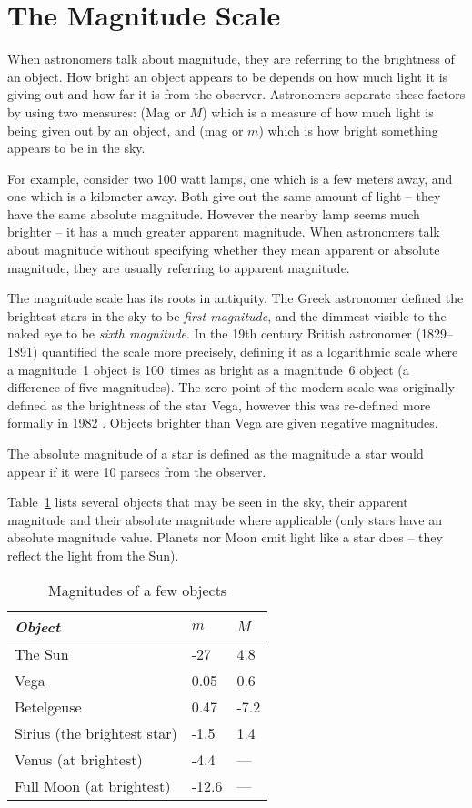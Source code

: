 \section{The Magnitude Scale}
\label{sec:Concepts:Magnitudes}


When astronomers talk about magnitude, they are referring to the
brightness of an object. How bright an object appears to be depends on
how much light it is giving out and how far it is from the observer.
Astronomers separate these factors by using two measures:  (Mag or $M$) which is a measure of how much light is being
given out by an object, and  (mag or $m$) which
is how bright something appears to be in the sky.

For example, consider two 100 watt lamps, one which is a few meters
away, and one which is a kilometer away. Both give out the same amount
of light -- they have the same absolute magnitude. However the nearby
lamp seems much brighter -- it has a much greater apparent magnitude.
When astronomers talk about magnitude without specifying whether they
mean apparent or absolute magnitude, they are usually referring to
apparent magnitude.

The magnitude scale has its roots in antiquity. The Greek astronomer
 defined the brightest stars in the sky to be \emph{first
magnitude}, and the dimmest visible to the naked eye to be \emph{sixth
magnitude}. In the 19th century British astronomer  (1829--1891)
quantified the scale more precisely, defining it as a logarithmic scale
where a magnitude~1 object is 100~times as bright as a magnitude~6
object (a difference of five magnitudes). The zero-point of the modern
scale was originally defined as the brightness of the star Vega, however
this was re-defined more formally in 1982 \citep{landolt}. Objects brighter
than Vega are given negative magnitudes.

The absolute magnitude of a star is defined as the magnitude a star
would appear if it were 10 parsecs from the observer.

Table~\ref{tab:Concepts:Magnitudes} lists several objects that may be seen
in the sky, their apparent magnitude and their absolute magnitude where
applicable (only stars have an absolute magnitude value. Planets nor Moon emit light like a star does -- they reflect the light from the Sun).

\begin{table}[htb]
  \centering
  \begin{tabular}{lll}
\toprule
\emph{Object} & $m$ & $M$\\\midrule
The Sun & -27 & 4.8\\
Vega & 0.05 & 0.6\\
Betelgeuse & 0.47 & -7.2\\
Sirius (the brightest star) & -1.5 & 1.4\\
Venus (at brightest) & -4.4 & ---\\
Full Moon (at brightest) & -12.6 & ---\\
\bottomrule
\end{tabular}
  \caption{Magnitudes of a few objects}
  \label{tab:Concepts:Magnitudes}
\end{table}


